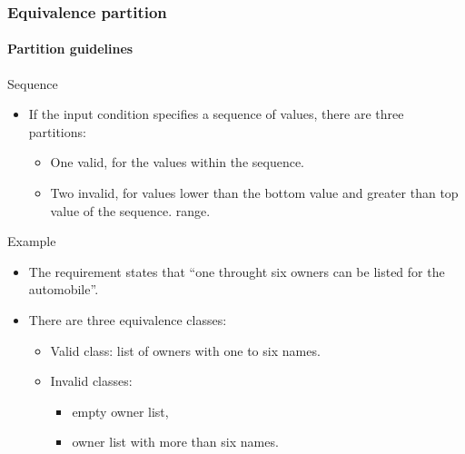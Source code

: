 \begin{frame}
\frametitle{Equivalence partition}
\framesubtitle{Partition guidelines}

\begin{block:fact}{Sequence}
\begin{itemize}
	\item If the input condition specifies a sequence of values, there are three
	partitions:
	\begin{itemize}
		\item One valid, for the values within the sequence.

		\item Two invalid, for values lower than the bottom value and greater
		than top value of the sequence.
		range.
	\end{itemize}
\end{itemize}
\end{block:fact}


\begin{block}{Example}
\begin{itemize}
	\item The requirement states that ``one throught six owners can be listed
	for the automobile''.

	\item There are three equivalence classes:
	\begin{itemize}
		\item Valid class: list of owners with one to six names.
		\item Invalid classes:
		\begin{itemize}
			\item empty owner list,
			\item owner list with more than six names.
		\end{itemize}
	\end{itemize}
\end{itemize}
\end{block}
\end{frame}



